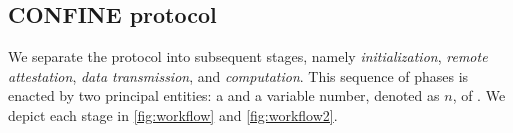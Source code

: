 \subsection{CONFINE protocol}

We separate the protocol into subsequent stages, namely \textit{initialization}, \textit{remote attestation}, \textit{data transmission}, and \textit{computation}. This sequence of phases is enacted by two principal entities: a  and a variable number, denoted as $n$, of . We depict each stage in \cref{fig:workflow} and \cref{fig:workflow2}.

